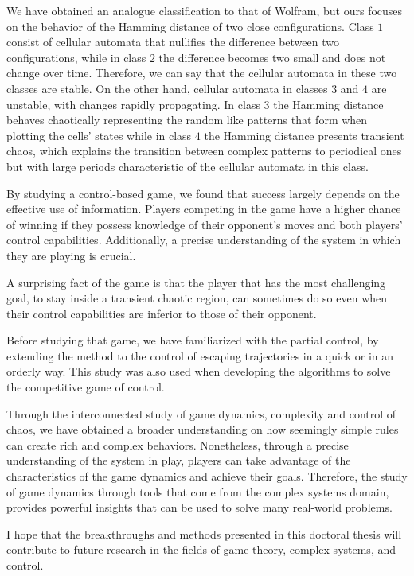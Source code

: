 We have obtained an analogue classification to that of Wolfram, but ours focuses on the behavior of the Hamming distance of two close configurations. Class $1$ consist of cellular automata that nullifies the difference between two configurations, while in class $2$ the difference becomes two small and does not change over time. Therefore, we can say that the cellular automata in these two classes are stable. On the other hand, cellular automata in classes $3$ and $4$ are unstable, with changes rapidly propagating. In class $3$ the Hamming distance behaves chaotically representing the random like patterns that form when plotting the cells' states while in class $4$ the Hamming distance presents transient chaos, which explains the transition between complex patterns to periodical ones but with large periods characteristic of the cellular automata in this class.

By studying a control-based game, we found that success largely depends on the effective use of information. Players competing in the game have a higher chance of winning if they possess knowledge of their opponent's moves and both players' control capabilities. Additionally, a precise understanding of the system in which they are playing is crucial.

A surprising fact of the game is that the player that has the most challenging goal, to stay inside a transient chaotic region, can sometimes do so even when their control capabilities are inferior to those of their opponent.

Before studying that game, we have familiarized with the partial control, by extending the method to the control of escaping trajectories in a quick or in an orderly way. This study was also used when developing the algorithms to solve the competitive game of control. 


Through the interconnected study of game dynamics, complexity and control of chaos, we have obtained a broader understanding on how seemingly simple rules can create rich and complex behaviors. Nonetheless, through a precise understanding of the system in play, players can take advantage of the characteristics of the game dynamics and achieve their goals. Therefore, the study of game dynamics through tools that come from the complex systems domain, provides powerful insights that can be used to solve many real-world problems.

I hope that the breakthroughs and methods presented in this doctoral thesis will contribute to future research in the fields of game theory, complex systems, and control.

